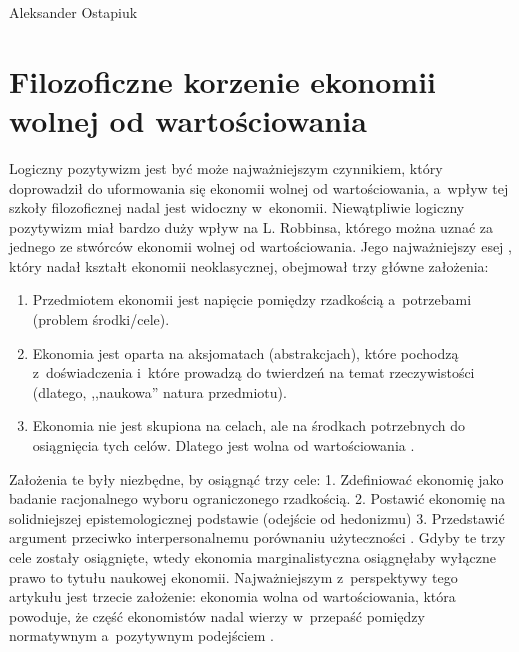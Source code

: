 \begin{artplenv}{Aleksander Ostapiuk}
\section{Filozoficzne korzenie ekonomii wolnej od wartościowania}
Logiczny pozytywizm jest być może najważniejszym czynnikiem, który doprowadził do uformowania się ekonomii wolnej od
wartościowania, a~wpływ tej szkoły filozoficznej nadal jest widoczny w~ekonomii. Niewątpliwie logiczny pozytywizm miał
bardzo duży wpływ na L. Robbinsa, którego można uznać za jednego ze stwórców ekonomii wolnej od wartościowania. Jego
najważniejszy esej
\parencite{robbins_essay_1935},
który nadał kształt ekonomii neoklasycznej, obejmował trzy
główne założenia:

\begin{enumerate}
\item Przedmiotem ekonomii jest napięcie pomiędzy rzadkością a~potrzebami (problem środki/cele).
\item Ekonomia jest oparta na aksjomatach (abstrakcjach), które pochodzą z~doświadczenia i~które prowadzą do twierdzeń
na temat rzeczywistości (dlatego, ,,naukowa'' natura przedmiotu). 
\item Ekonomia nie jest skupiona na celach, ale na środkach potrzebnych do osiągnięcia tych celów. Dlatego jest wolna od
wartościowania
\parencite[s.~58]{witztum_ethics_2007}.
\end{enumerate}

Założenia te były niezbędne, by osiągnąć trzy cele: 1. Zdefiniować ekonomię jako badanie racjonalnego wyboru
ograniczonego rzadkością. 2. Postawić ekonomię na solidniejszej epistemologicznej podstawie (odejście od
hedonizmu) 3. Przedstawić argument przeciwko interpersonalnemu porównaniu użyteczności
\parencite{hands_effective_2007}.
Gdyby te trzy cele zostały osiągnięte, wtedy ekonomia marginalistyczna osiągnęłaby wyłączne prawo to tytułu
naukowej ekonomii. Najważniejszym z~perspektywy tego artykułu jest trzecie założenie: ekonomia wolna od wartościowania,
która powoduje, że część ekonomistów nadal wierzy w~przepaść pomiędzy normatywnym a~pozytywnym
podejściem
\parencite{van_dalen_values_2019}.


\end{artplenv}
